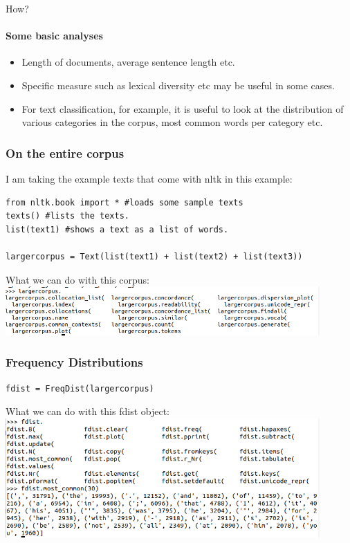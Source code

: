 \documentclass{beamer}
\begin{document}
\begin{frame}{How?}
\framesubtitle{Some basic analyses}
    \begin{itemize}
        \item Length of documents, average sentence length etc.
        \item Specific measure such as lexical diversity etc may be useful in some cases.
        \item For text classification, for example, it is useful to look at the distribution of various categories in the corpus, most common words per category etc.
    \end{itemize}
\end{frame}

\begin{frame}[fragile]
\frametitle{On the entire corpus}
I am taking the example texts that come with nltk in this example: 
\tiny
\begin{verbatim}
from nltk.book import * #loads some sample texts
texts() #lists the texts.
list(text1) #shows a text as a list of words.

largercorpus = Text(list(text1) + list(text2) + list(text3))
\end{verbatim}

What we can do with this corpus:
\includegraphics[width=0.9\textwidth]{figures/largercorpus.png}

\end{frame}

\begin{frame}[fragile]
\frametitle{Frequency Distributions}
\begin{verbatim}
fdist = FreqDist(largercorpus)
\end{verbatim}

What we can do with this fdist object:
\includegraphics[width=0.9\textwidth]{figures/fdist.png}

\end{frame}
\end{document}
